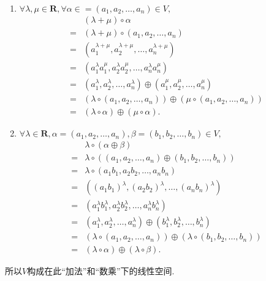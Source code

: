 \begin{solution}
\begin{enumerate}
\begin{enumerate}
                    \item $\forall \lambda, \mu \in \mathbf{R}, \forall \alpha \in = (a_1, a_2, \ldots, a_n) \in V,$
                    \begin{align*}
                        & (\lambda + \mu) \circ \alpha \\ ={} & (\lambda + \mu) \circ (a_1, a_2, \ldots, a_n) \\ ={} & (a_1^{\lambda + \mu}, a_2^{\lambda + \mu}, \ldots, a_n^{\lambda + \mu}) \\ ={} & (a_1^\lambda a_1^\mu, a_2^\lambda a_2^\mu, \ldots, a_n^\lambda a_n^\mu) \\ ={} & (a_1^\lambda, a_2^\lambda, \ldots, a_n^\lambda) \oplus (a_1^\mu, a_2^\mu, \ldots, a_n^\mu) \\ ={} & (\lambda \circ (a_1, a_2, \ldots, a_n)) \oplus (\mu \circ (a_1, a_2, \ldots, a_n)) \\ ={} & (\lambda \circ \alpha) \oplus (\mu \circ \alpha).
                    \end{align*}

                    \item $\forall \lambda \in \mathbf{R}, \alpha = (a_1, a_2, \ldots, a_n), \beta = (b_1, b_2, \ldots, b_n) \in V,$
                    \begin{align*}
                        & \lambda \circ (\alpha \oplus \beta) \\ ={} & \lambda \circ ((a_1, a_2, \ldots, a_n) \oplus (b_1, b_2, \ldots, b_n)) \\ ={} & \lambda \circ (a_1b_1, a_2b_2, \ldots , a_nb_n) \\ ={} & ((a_1b_1)^\lambda, (a_2b_2)^\lambda, \ldots , (a_nb_n)^\lambda) \\ ={} & (a_1^\lambda b_1^\lambda, a_2^\lambda b_2^\lambda, \ldots , a_n^\lambda b_n^\lambda) \\ ={} & (a_1^\lambda, a_2^\lambda, \ldots, a_n^\lambda) \oplus (b_1^\lambda, b_2^\lambda, \ldots, b_n^\lambda) \\ ={} & (\lambda \circ (a_1, a_2, \ldots, a_n)) \oplus (\lambda \circ (b_1, b_2, \ldots, b_n)) \\ ={} & (\lambda \circ \alpha) \oplus (\lambda \circ \beta).
                    \end{align*}
                \end{enumerate}
                所以$V$构成在此“加法”和“数乘”下的线性空间.


\end{enumerate}
\end{solution}
